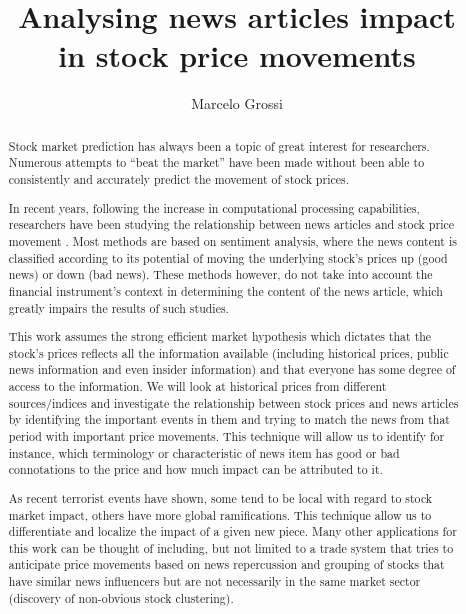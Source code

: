 \documentclass{article}
\title{Analysing news articles impact \\ in stock price movements}
\author{Marcelo Grossi}
\begin{document}
\maketitle
\begin{abstract}
Stock market prediction has always been a topic of great interest for researchers. Numerous attempts to ``beat the market'' have been made without been able to consistently and accurately predict the movement of stock prices.
\par
In recent years, following the increase in computational processing capabilities, researchers have been studying the relationship between news articles and stock price movement \citep{Fu2008}\citep{Schumaker2009}. Most methods are based on sentiment analysis, where the news content is classified according to its potential of moving the underlying stock’s prices up (good news) or down (bad news). These methods however, do not take into account the financial instrument's context in determining the content of the news article, which greatly impairs the results of such studies.
\par
This work assumes the strong efficient market hypothesis which dictates that the stock's prices reflects all the information available (including historical prices, public news information and even insider information) \citep{fama1965behavior} and that everyone has some degree of access to the information. We will look at historical prices from different sources/indices and investigate the relationship between stock prices and news articles by identifying the important events in them and trying to match the news from that period with important price movements. This technique will allow us to identify for instance, which terminology or characteristic of news item has good or bad connotations to the price and how much impact can be attributed to it.
\par
As recent terrorist events have shown, some tend to be local with regard to stock market impact, others have more global ramifications.  This technique allow us to differentiate and localize the impact of a given new piece. Many other applications for this work can be thought of including, but not limited to a trade system that tries to anticipate price movements based on news repercussion and grouping of stocks that have similar news influencers but are not necessarily in the same market sector (discovery of non-obvious stock clustering).
\end{abstract}
\end{document}
